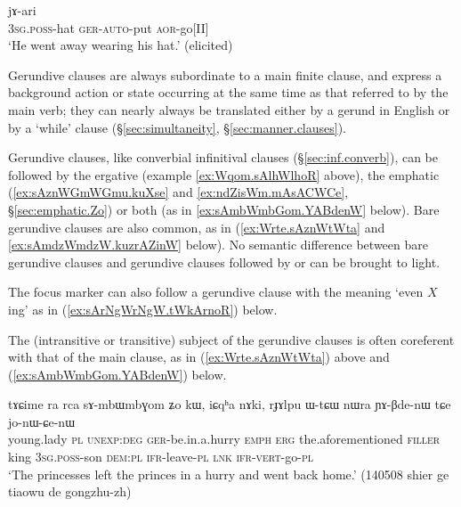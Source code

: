 \begin{exe}
\ex \label{ex:Wrte.sAznWtWta}
 jɤ-ari \\
\textsc{3sg}.\textsc{poss}-hat \textsc{ger}-\textsc{auto}-put \textsc{aor}-go[II] \\
\glt `He went away wearing his hat.' (elicited)
\end{exe}

Gerundive clauses are always subordinate to a main finite clause, and express a background action or state occurring at the same time as that referred to by the main verb; they can nearly always be translated either by a gerund in English or by a `while' clause (§\ref{sec:simultaneity}, §\ref{sec:manner.clauses}).

Gerundive clauses, like converbial infinitival clauses (§\ref{sec:inf.converb}), can be followed by the ergative  (example \ref{ex:Wqom.sAlhWlhoR} above), the emphatic  (\ref{ex:sAznWGmWGmu.kuXse} and \ref{ex:ndZisWm.mAsACWCe}, §\ref{sec:emphatic.Zo}) or both (as in \ref{ex:sAmbWmbGom.YABdenW} below). Bare gerundive clauses are also common, as in (\ref{ex:Wrte.sAznWtWta} and \ref{ex:sAmdzWmdzW.kuzrAZinW} below). No semantic difference between bare gerundive clauses and gerundive clauses followed by  or  can be brought to light. 

The focus marker  can also follow a gerundive clause with the meaning `even $X$ing' as in (\ref{ex:sArNgWrNgW.tWkArnoR}) below.

The (intransitive or transitive) subject of the gerundive clauses is often coreferent with that of the main clause, as in (\ref{ex:Wrte.sAznWtWta}) above and (\ref{ex:sAmbWmbGom.YABdenW}) below.

\begin{exe}
\ex \label{ex:sAmbWmbGom.YABdenW}
\gll tɤɕime ra rca sɤ-mbɯ\redp{}mbɣom ʑo kɯ, iɕqʰa nɤki, rɟɤlpu ɯ-tɕɯ nɯra ɲɤ-βde-nɯ tɕe jo-nɯ-ɕe-nɯ \\
young.lady \textsc{pl} \textsc{unexp}:\textsc{deg} \textsc{ger}-be.in.a.hurry \textsc{emph} \textsc{erg} the.aforementioned \textsc{filler} king \textsc{3sg}.\textsc{poss}-son \textsc{dem}:\textsc{pl} \textsc{ifr}-leave-\textsc{pl} \textsc{lnk} \textsc{ifr}-\textsc{vert}-go-\textsc{pl} \\
\glt `The princesses left the princes in a hurry and went back home.' (140508 shier ge tiaowu de gongzhu-zh) 
\end{exe}

